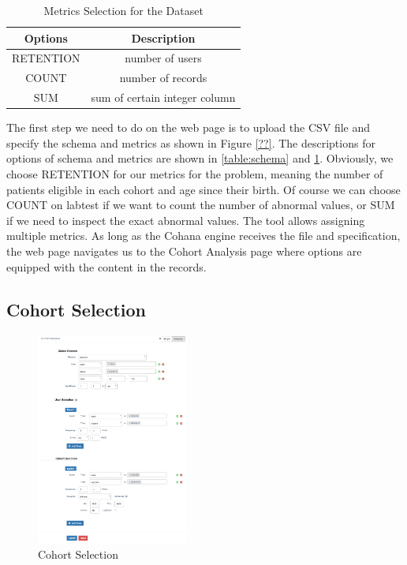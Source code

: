 \documentclass[10pt,conference,letterpaper]{IEEEtran}
\begin{document}
\begin{table}[h!]
\begin{center}
    \begin{tabular}{ | c | c | }
        \hline
        Options & Description \\[0.5ex] 
        \hline\hline
        RETENTION & number of users \\
        \hline
        COUNT & number of records \\
        \hline
        SUM & sum of certain integer column \\
        \hline
    \end{tabular}
\end{center}
\caption{Metrics Selection for the Dataset}
\label{table:metrics}
\end{table}

The first step we need to do on the web page is to upload the CSV file and specify the schema and metrics as shown in Figure \ref{??}. The descriptions for options of schema and metrics are shown in \ref{table:schema} and \ref{table:metrics}. Obviously, we choose RETENTION for our metrics for the problem, meaning the number of patients eligible in each cohort and age since their birth. Of course we can choose COUNT on labtest if we want to count the number of abnormal values, or SUM if we need to inspect the exact abnormal values. The tool allows assigning multiple metrics. As long as the Cohana engine receives the file and specification, the web page navigates us to the Cohort Analysis page where options are equipped with the content in the records.

\subsection{Cohort Selection}

\begin{figure}
    \centering
    \includegraphics[width=0.45\textwidth]{query.png}
    \caption{Cohort Selection}
    \label{fig:query}
\end{figure}
\end{document}
